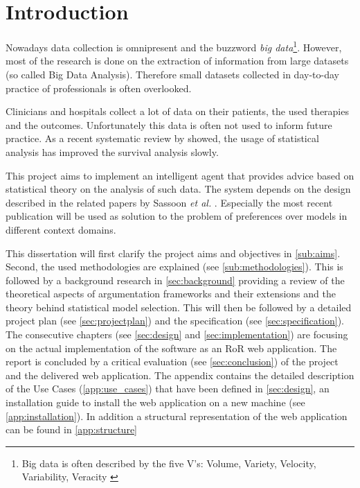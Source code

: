 \section{Introduction}


Nowadays data collection is omnipresent and the buzzword \textit{big data}\footnote{Big data is often described by the five V's: Volume, Variety, Velocity, Variability, Veracity \cite{Hilbert2015}}. However, most of the research is done on the extraction of information from large datasets (so called Big Data Analysis). Therefore small datasets collected in day-to-day practice of professionals is often overlooked. 

Clinicians and hospitals collect a lot of data on their patients, the used therapies and the outcomes. Unfortunately this data is often not used to inform future practice. As a recent systematic review by \cite{survivalAnalysis} showed, the usage of statistical analysis has improved the survival analysis slowly. 

This project aims to implement an intelligent agent that provides advice based on statistical theory on the analysis of such data. The system depends on the design described in the related papers by Sassoon \textit{et al.} \cite{sassoon2014,sassoon2016,sassoon2016CD}. Especially the most recent publication will be used as solution to the problem of preferences over models in different context domains. 



This dissertation will first clarify the project aims and objectives in \autoref{sub:aims}. Second, the used methodologies are explained (see \autoref{sub:methodologies}). This is followed by a background research in \autoref{sec:background} providing a review of the theoretical aspects of argumentation frameworks and their extensions and the theory behind statistical model selection. 
This will then be followed by a detailed project plan (see \autoref{sec:projectplan}) and the specification (see \autoref{sec:specification}). The consecutive chapters (see \autoref{sec:design} and \ref{sec:implementation}) are focusing on the actual implementation of the software as an \gls{RoR} web application. 
The report is concluded by a critical evaluation (see \autoref{sec:conclusion}) of the project and the delivered web application. 
The appendix contains the detailed description of the Use Cases (\autoref{app:use_cases}) that have been defined in \autoref{sec:design}, an installation guide to install the web application on a new machine (see \autoref{app:installation}). In addition a structural representation of the web application can be found in \autoref{app:structure}

